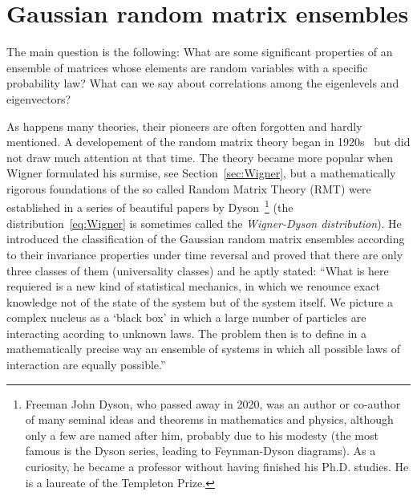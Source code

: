 \documentclass[a4paper,11pt,twoside]{article}
\begin{document}
\section{Gaussian random matrix ensembles}
    The main question is the following: 
    What are some significant properties of an ensemble of matrices whose elements are random variables with a specific probability law? 
    What can we say about correlations among the eigenlevels and eigenvectors?
    
    As happens many theories, their pioneers are often forgotten and hardly mentioned. 
    A developement of the random matrix theory began in 1920s~\cite{Wis28} but did not draw much attention at that time.
    The theory became more popular when Wigner formulated his surmise, see Section~\ref{sec:Wigner},
    but a mathematically rigorous foundations of the so called Random Matrix Theory (RMT) were established in a series of beautiful papers by Dyson~\cite{Dys62}\footnote{
        Freeman John Dyson, who passed away in 2020, was an author or co-author of many seminal ideas and theorems in mathematics and physics, although only a few are named after him, probably due to his modesty (the most famous is the Dyson series, leading to Feynman-Dyson diagrams). As a curiosity, he became a professor without having finished his Ph.D. studies.
        He is a laureate of the Templeton Prize.
    }
    (the distribution~\eqref{eq:Wigner} is sometimes called the \emph{Wigner-Dyson distribution}).
    He introduced the classification of the Gaussian random matrix ensembles according to their invariance properties under time reversal and proved that there are only three classes of them (universality classes) and he aptly stated: ``What is here requiered is a new kind of statistical mechanics, in which we renounce exact knowledge not of the state of the system but of the system itself.
    We picture a complex nucleus as a `black box' in which a large number of particles are interacting acording to unknown laws.
    The problem then is to define in a mathematically precise way an ensemble of systems in which all possible laws of interaction are equally possible.''
\end{document}
